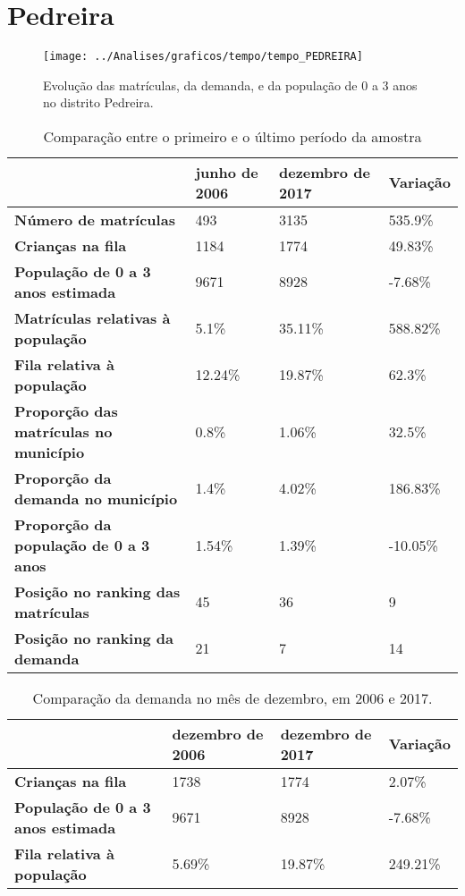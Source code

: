 \section{Pedreira}
\begin{figure}[H]
\centering
\texttt{[image: ../Analises/graficos/tempo/tempo\_PEDREIRA]}
\caption{Evolução das matrículas, da demanda, e da população de 0 a 3 anos no distrito Pedreira.}
\end{figure}
\begin{table}[H]
\begin{tabular}{|l|l|l|l|}
\hline
\textbf{}                                      & \textbf{junho de 2006}       & \textbf{dezembro de 2017}    & \textbf{Variação} \\ \hline
\textbf{Número de matrículas}                  & 493 & 3135 & 535.9\% \\ \hline
\textbf{Crianças na fila}                      & 1184 & 1774 & 49.83\% \\ \hline
\textbf{População de 0 a 3 anos estimada}      & 9671 & 8928 & -7.68\% \\ \hline
\textbf{Matrículas relativas à população}      & 5.1\% & 35.11\% & 588.82\% \\ \hline
\textbf{Fila relativa à população}             & 12.24\% & 19.87\% & 62.3\% \\ \hline
\textbf{Proporção das matrículas no município} & 0.8\% & 1.06\% & 32.5\% \\ \hline
\textbf{Proporção da demanda no município}     & 1.4\% & 4.02\% & 186.83\% \\ \hline
\textbf{Proporção da população de 0 a 3 anos}  & 1.54\% & 1.39\% & -10.05\% \\ \hline
\textbf{Posição no ranking das matrículas}     & 45 & 36 & 9 \\ \hline
\textbf{Posição no ranking da demanda}         & 21 & 7 & 14 \\ \hline
\end{tabular}
\caption{Comparação entre o primeiro e o último período da amostra}
\end{table}
\begin{table}[H]
\begin{tabular}{|l|l|l|l|}
\hline
\textbf{}                                 & \textbf{dezembro de 2006} & \textbf{dezembro de 2017} & \textbf{Variação} \\ \hline
\textbf{Crianças na fila}                      & 1738 & 1774 & 2.07\% \\ \hline
\textbf{População de 0 a 3 anos estimada}      & 9671 & 8928 & -7.68\% \\ \hline
\textbf{Fila relativa à população}             & 5.69\% & 19.87\% & 249.21\% \\ \hline
\end{tabular}
\caption{Comparação da demanda no mês de dezembro, em 2006 e 2017.}
\end{table}
